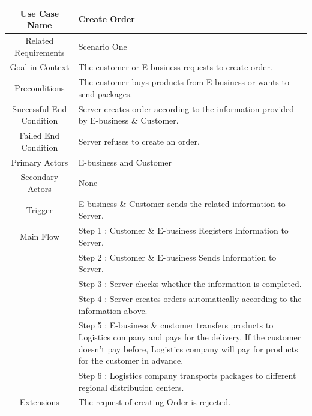 \documentclass[12pt]{scrreprt}
\begin{document}
\begin{table}
  \centering
  \begin{tabular}{| c | p{11cm} |}
    \hline
    Use Case Name & Create Order\\
    \hline
    Related Requirements & Scenario One\\
    \hline
    Goal in Context & The customer or E-business requests to create order.\\
    \hline
    Preconditions & The customer buys products from E-business or wants to
    send packages.\\
    \hline
    Successful End Condition & Server creates order according to the
    information provided by E-business \& Customer.\\
    \hline
    Failed End Condition & Server refuses to create an order.\\
    \hline
    Primary Actors & E-business and Customer\\
    \hline
    Secondary Actors & None\\
    \hline
    Trigger & E-business \& Customer sends the related information to Server.\\
    \hline
    Main Flow & Step 1 : Customer \& E-business Registers Information to Server.\\
    & Step 2 : Customer \& E-business Sends Information to Server.\\
    & Step 3 : Server checks whether the information is completed.\\
    & Step 4 : Server creates orders automatically according to the information above.\\
    & Step 5 : E-business \& customer transfers products to Logistics
    company and pays for the delivery. If the customer doesn’t pay before,
    Logistics company will pay for products for the customer in advance.\\
    & Step 6 : Logistics company transports packages to different regional
    distribution centers.\\
    \hline
    Extensions & The request of creating Order is rejected.\\
    \hline
  \end{tabular}
\end{table}
\end{document}
